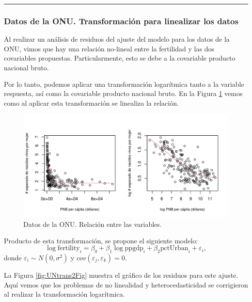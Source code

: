 \documentclass[
]{article}
\begin{document}
\rule{\textwidth}{0.4pt}

\hypertarget{datos-de-la-onu.-transformaciuxf3n-para-linealizar-los-datos}{%
\subsubsection*{Datos de la ONU. Transformación para linealizar los datos}\label{datos-de-la-onu.-transformaciuxf3n-para-linealizar-los-datos}}

Al realizar un análisis de residuos del ajuste del modelo para los datos de la ONU, vimos que hay una relación no-lineal entre la fertilidad y las dos covariables propuestas. Particularmente, esto se debe a la covariable producto nacional bruto.

Por lo tanto, podemos aplicar una transformación logarítmica tanto a la variable respuesta, así como la covariable producto nacional bruto. En la Figura \ref{fig:UNtransFig} vemos como al aplicar esta transformación se linealiza la relación.

\begin{figure}

{\centering \includegraphics{MLG1_files/figure-latex/UNtransFig-1} 

}

\caption{Datos de la ONU. Relación entre las variables.}\label{fig:UNtransFig}
\end{figure}

Producto de esta transformación, se propone el siguiente modelo:
\[
\log \mbox{fertility}_{i} = \beta_{0} + \beta_{1}\log \mbox{ppgdp}_{i} + \beta_{2}\mbox{pctUrban}_{i} + \varepsilon_{i},
\]
donde \(\varepsilon_{i}\sim N(0,\sigma^{2})\) y \(cov(\varepsilon_{j},\varepsilon_{k})=0\).

La Figura \ref{fig:UNtrans2Fig} muestra el gráfico de los residuos para este ajuste. Aquí vemos que los problemas de no linealidad y heterocedasticidad se corrigieron al realizar la transformación logarítmica.
\end{document}
